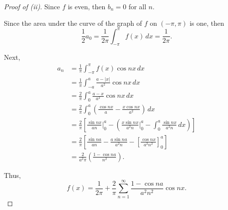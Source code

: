 \documentclass[../hw5]{subfiles}
\begin{document}
\begin{proof}[Proof of (ii)]
	Since $f$ is even, then $b_n=0$ for all $n$.

	Since the area under the curve of the graph of $f$ on $(-\pi,\pi)$ is one, then \[
		\frac{1}{2}a_0 = \frac{1}{2\pi}\int_{-\pi}^{\pi} f(x) \,dx = \frac{1}{2\pi}
		.\]

	Next,
	\begin{align*}
		a_n & = \frac{1}{\pi} \int_{-\pi}^{\pi} f(x)\cos{nx} \,dx                                                                                                                   \\
		    & = \frac{1}{\pi}\int_{-a }^{a} \frac{a- |x|}{a^2}\cos{nx}\,dx                                                                                                          \\
		    & = \frac{2}{\pi}\int_{0}^{a} \frac{a-x}{a^2}\cos{nx} \,dx                                                                                                              \\
		    & = \frac{2}{\pi}\int_{0}^{a} \left( \frac{\cos{nx}}{a}-\frac{x\cos{nx}}{a^2} \right) \,dx                                                                              \\
		    & = \frac{2}{\pi}\left[ \frac{\sin{nx} }{an}\bigg\vert_0^a - \left( \frac{x\sin{nx} }{a^2 n}\bigg\vert_0^a - \int_{0}^{a} \frac{\sin{nx} }{a^2 n} \,dx \right)  \right] \\
		    & = \frac{2}{\pi} \left[ \frac{\sin{na} }{an}- \frac{a\sin{na} }{a^2 n} - {\left[ \frac{\cos{nx} }{a^2n^2} \right] }_0^a \right]                                        \\
		    & = \frac{2}{a^2 \pi} \left( \frac{1-\cos{na} }{n^2} \right)
		.\end{align*}

	Thus, \[
		f(x) = \frac{1}{2\pi} + \frac{2}{\pi}\sum_{n=1}^{\infty} \frac{1-\cos{na} }{a^2n^2}\cos{nx}
		.\]
\end{proof}
\end{document}

